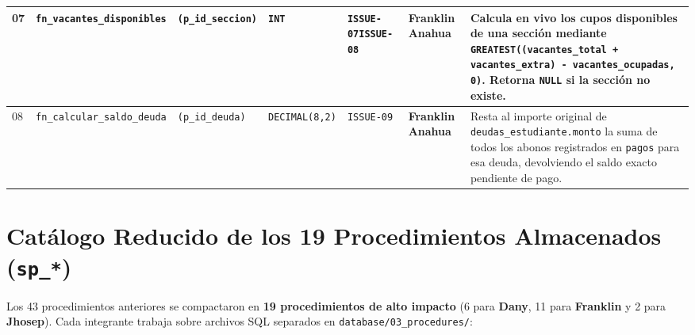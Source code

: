 \documentclass[10pt,a4paper,landscape]{article}
\newcommand{\devFranklin}{\textbf{\textcolor{teal!80!black}{Franklin Anahua}} \newline {\scriptsize(Backend / DB)}}
\begin{document}
\begin{longtable}{|p{0.5cm}|p{4.8cm}|p{4.3cm}|p{2.3cm}|p{2.2cm}|p{2.6cm}|p{8.5cm}|}
\hline
07 & \texttt{fn\_vacantes\_disponibles} & \texttt{(p\_id\_seccion)} & \texttt{INT} & \texttt{ISSUE-07}\newline \texttt{ISSUE-08} & \devFranklin & Calcula en vivo los cupos disponibles de una sección mediante \texttt{GREATEST((vacantes\_total + vacantes\_extra) - vacantes\_ocupadas, 0)}. Retorna \texttt{NULL} si la sección no existe. \\
\hline
\rowcolor{rowAlt}
08 & \texttt{fn\_calcular\_saldo\_deuda} & \texttt{(p\_id\_deuda)} & \texttt{DECIMAL(8,2)} & \texttt{ISSUE-09} & \devFranklin & Resta al importe original de \texttt{deudas\_estudiante.monto} la suma de todos los abonos registrados en \texttt{pagos} para esa deuda, devolviendo el saldo exacto pendiente de pago. \\
\hline
\end{longtable}
\normalsize

\newpage

\section{Catálogo Reducido de los 19 Procedimientos Almacenados (\texttt{sp\_*})}

Los 43 procedimientos anteriores se compactaron en \textbf{19 procedimientos de alto impacto} (6 para \textbf{Dany}, 11 para \textbf{Franklin} y 2 para \textbf{Jhosep}). Cada integrante trabaja sobre archivos SQL separados en \texttt{database/03\_procedures/}:
\end{document}
